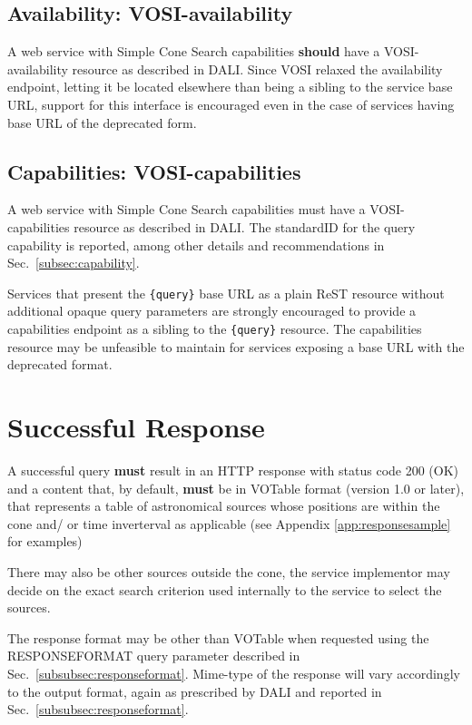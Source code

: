 \documentclass[11pt,a4paper]{ivoa} 
\begin{document}
\subsection{Availability: VOSI-availability} A web service with Simple
Cone Search capabilities \textbf{should} have a VOSI-availability
resource as described in DALI. Since VOSI relaxed the availability
endpoint, letting it be located elsewhere than being a sibling to the
service base URL, support for this interface is encouraged even in the
case of services having base URL of the deprecated form.

\subsection{Capabilities: VOSI-capabilities} A web service with Simple
Cone Search capabilities must have a VOSI-capabilities resource as
described in DALI. The standardID for the {query} capability is
reported, among other details and recommendations in
Sec.~\ref{subsec:capability}.

Services that present the \texttt{\{query\}} base URL as a plain ReST
resource without additional opaque query parameters are strongly
encouraged to provide a capabilities endpoint as a sibling to the
\texttt{\{query\}} resource. The capabilities resource may be unfeasible
to maintain for services exposing a base URL with the deprecated format.

\section{Successful Response} \label{sec:response} A successful query
\textbf{must} result in an HTTP response with status code 200 (OK) and a
content that, by default, \textbf{must} be in VOTable format (version
1.0 or later), that represents a table of astronomical sources whose
positions are within the cone and/ or time inverterval as applicable
(see Appendix \ref{app:responsesample} for examples)

There may also be other sources outside the cone, the service
implementor may decide on the exact search criterion used internally to
the service to select the sources.

The response format may be other than VOTable when requested using the
RESPONSEFORMAT query parameter described in
Sec.~\ref{subsubsec:responseformat}. Mime-type of the response will vary
accordingly to the output format, again as prescribed by DALI and
reported in Sec.~\ref{subsubsec:responseformat}.
\end{document}
